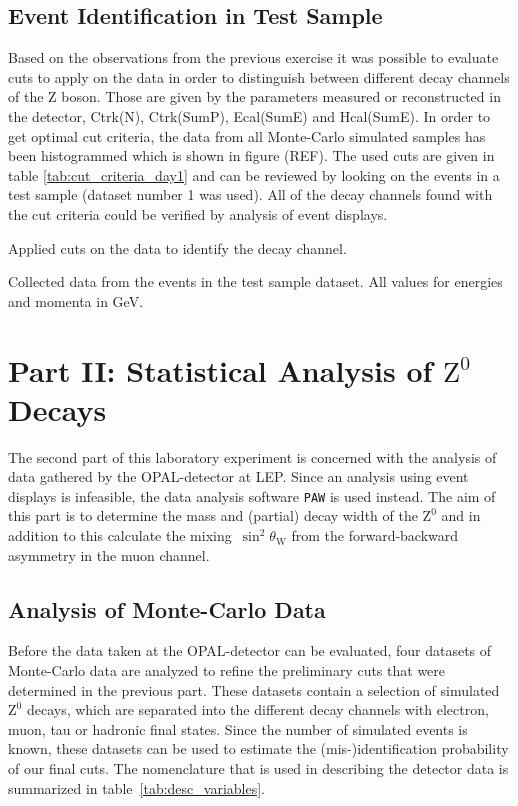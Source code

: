 \documentclass[11pt, a4paper]{article}
\numberwithin{equation}{section}
\newcommand{\korr}[1]{{\color{red}(#1)}}
\begin{document}
\subsection{Event Identification in Test Sample}

Based on the observations from the previous exercise it was possible to evaluate cuts to apply on the data in order to distinguish between different decay channels of the Z boson.
Those are given by the parameters measured or reconstructed in the detector, Ctrk(N), Ctrk(SumP), Ecal(SumE) and Hcal(SumE).
In order to get optimal cut criteria, the data from all Monte-Carlo simulated samples has been histogrammed which is shown in figure \korr{REF}.
The used cuts are given in table \ref{tab:cut_criteria_day1} and can be reviewed by looking on the events in a test sample (dataset number 1 was used).
All of the decay channels found with the cut criteria could be verified by analysis of event displays.
\begin{table}[h]
	\centering
	
	\caption{Applied cuts on the data to identify the decay channel.}
	\label{tab:cut_criteria_day1}
\end{table}
\begin{table}
	\centering
		
	\caption{Collected data from the events in the test sample dataset. All values for energies and momenta in \si{GeV}.}
\end{table}

\clearpage
\section{Part II: Statistical Analysis of $\mathrm{Z}^0$ Decays}
The second part of this laboratory experiment is concerned with the analysis of data gathered by the OPAL-detector at LEP.
Since an analysis using event displays is infeasible, the data analysis software \texttt{PAW} is used instead.
The aim of this part is to determine the mass and (partial) decay width of the $\mathrm{Z}^0$ and in addition to this calculate the mixing~$\sin^2\theta_\mathrm{W}$ from the forward-backward asymmetry in the muon channel.

\subsection{Analysis of Monte-Carlo Data}
\label{sec:analysis_mc_data}
Before the data taken at the OPAL-detector can be evaluated, four datasets of Monte-Carlo data are analyzed to refine the preliminary cuts that were determined in the previous part.
These datasets contain a selection of simulated $\mathrm{Z}^0$ decays, which are separated into the different decay channels with electron, muon, tau or hadronic final states.
Since the number of simulated events is known, these datasets can be used to estimate the (mis-)identification probability of our final cuts.
The nomenclature that is used in describing the detector data is summarized in table~\ref{tab:desc_variables}.
\end{document}

